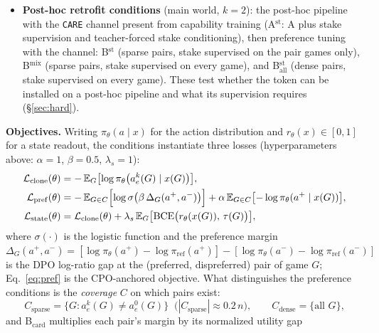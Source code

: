\documentclass[manuscript, screen, review]{jair}
\newcommand{\care}{\texttt{CARE}}
\begin{document}
\begin{itemize}
  $k \in \{0, .5, 1, 2, 4\}$ with normalized $k$ as an input feature (\S\ref{sec:dialruntime}).
\item \textbf{Post-hoc retrofit conditions} (main world, $k{=}2$): the post-hoc
  pipeline with the \care{} channel present from capability training
  (A$^{\mathrm{st}}$: A plus stake supervision and teacher-forced stake
  conditioning), then preference tuning with the channel: B$^{\mathrm{st}}$
  (sparse pairs, stake supervised on the pair games only), B$^{\mathrm{mix}}$
  (sparse pairs, stake supervised on every game), and
  B$_{\mathrm{all}}^{\mathrm{st}}$ (dense pairs, stake supervised on every
  game). These test whether the token can be installed on a post-hoc pipeline
  and what its supervision requires (\S\ref{sec:hard}).
\end{itemize}
\textbf{Objectives.} Writing $\pi_\theta(a \mid x)$ for the action distribution and
$r_\theta(x) \in [0,1]$ for a state readout, the conditions instantiate three losses
(hyperparameters above: $\alpha{=}1$, $\beta{=}0.5$, $\lambda_s{=}1$):
\begin{align}
\mathcal{L}_{\mathrm{clone}}(\theta) &=
-\,\mathbb{E}_{G}\bigl[\log \pi_\theta\bigl(a^{k}_{e}(G) \mid x(G)\bigr)\bigr],
\label{eq:clone}\\
\mathcal{L}_{\mathrm{pref}}(\theta) &=
-\,\mathbb{E}_{G \in C}\Bigl[\log \sigma\bigl(\beta\,\Delta_{G}(a^{+}, a^{-})\bigr)\Bigr]
+ \alpha\, \mathbb{E}_{G \in C}\bigl[-\log \pi_\theta(a^{+} \mid x(G))\bigr],
\label{eq:pref}\\
\mathcal{L}_{\mathrm{state}}(\theta) &=
\mathcal{L}_{\mathrm{clone}}(\theta) + \lambda_s\,
\mathbb{E}_{G}\bigl[\mathrm{BCE}\bigl(r_\theta(x(G)),\, \tau(G)\bigr)\bigr],
\label{eq:state}
\end{align}
where $\sigma(\cdot)$ is the logistic function and the preference margin
$\Delta_{G}(a^{+},a^{-}) = [\log\pi_\theta(a^{+}) - \log\pi_{\mathrm{ref}}(a^{+})] -
[\log\pi_\theta(a^{-}) - \log\pi_{\mathrm{ref}}(a^{-})]$ is the DPO log-ratio gap at the
(preferred, dispreferred) pair of game $G$; Eq.~\eqref{eq:pref} is the CPO-anchored
objective. What distinguishes the preference conditions is the \emph{coverage} $C$ on which
pairs exist:
\begin{equation}
C_{\mathrm{sparse}} = \bigl\{G : a^{k}_{e}(G) \neq a^{0}_{e}(G)\bigr\}\;\;\bigl(|C_{\mathrm{sparse}}| \approx 0.2\,n\bigr),
\qquad
C_{\mathrm{dense}} = \{\text{all } G\},
\label{eq:coverage}
\end{equation}
and B$_{\mathrm{card}}$ multiplies each pair's margin by its normalized utility gap
\end{document}
